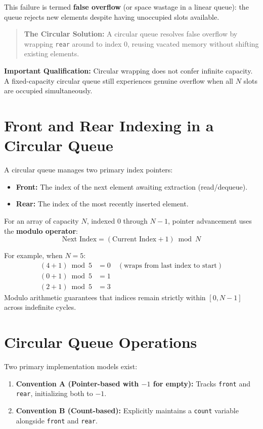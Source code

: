 This failure is termed \textbf{false overflow} (or space wastage in a linear queue): the queue rejects new elements despite having unoccupied slots available.

\begin{quote}
\textbf{The Circular Solution:} A circular queue resolves false overflow by wrapping \texttt{rear} around to index $0$, reusing vacated memory without shifting existing elements.
\end{quote}

\textbf{Important Qualification:} Circular wrapping does not confer infinite capacity. A fixed-capacity circular queue still experiences genuine overflow when all $N$ slots are occupied simultaneously.

\section{Front and Rear Indexing in a Circular Queue}

A circular queue manages two primary index pointers:
\begin{itemize}
    \item \textbf{Front:} The index of the next element awaiting extraction (read/dequeue).
    \item \textbf{Rear:} The index of the most recently inserted element.
\end{itemize}

For an array of capacity $N$, indexed $0$ through $N-1$, pointer advancement uses the \textbf{modulo operator}:
\[
\boxed{\text{Next Index} = (\text{Current Index} + 1) \bmod N}
\]

For example, when $N = 5$:
\begin{align*}
(4 + 1) \bmod 5 &= 0 \quad (\text{wraps from last index to start}) \\
(0 + 1) \bmod 5 &= 1 \\
(2 + 1) \bmod 5 &= 3
\end{align*}
Modulo arithmetic guarantees that indices remain strictly within $[0, N-1]$ across indefinite cycles.

\section{Circular Queue Operations}

Two primary implementation models exist:
\begin{enumerate}
    \item \textbf{Convention A (Pointer-based with $-1$ for empty):} Tracks \texttt{front} and \texttt{rear}, initializing both to $-1$.
    \item \textbf{Convention B (Count-based):} Explicitly maintains a \texttt{count} variable alongside \texttt{front} and \texttt{rear}.
\end{enumerate}

